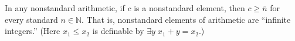 In any nonstandard arithmetic, if $c$ is a nonstandard element, then $c \geq \bar{n}$ for every standard $n \in \mathbb{N}$. That is, nonstandard elements of arithmetic are ``infinite integers.'' (Here $x_1 \leq x_2$ is definable by $\exists y \; x_1 + y = x_2$.)
